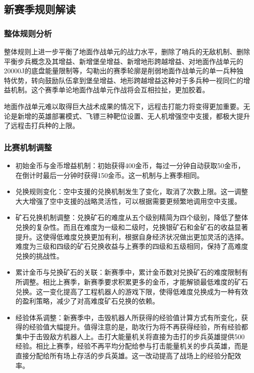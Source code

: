 \subsection{新赛季规则解读}

    \subsubsection{整体规则分析}

        整体规则上进一步平衡了地面作战单元的战力水平，删除了哨兵的无敌机制、删除平衡步兵概念及其增益、新增堡垒增益、新增地形跨越增益、对地面作战单元的20000J的底盘能量限制等，勾勒出的赛季轮廓是削弱地面作战单元的单一兵种独特优势，转向鼓励队伍拿到堡垒增益、地形跨越增益这种对于多兵种一视同仁的增益机制。这个赛季单论地面作战单元作战将会互相拉扯，更加胶着。\par
        地面作战单元难以取得巨大战术成果的情况下，远程击打能力将变得更加重要。无论是新增的英雄部署模式、飞镖三种靶位设置、无人机增强空中支援，都极大提升了远程击打兵种的上限。\par

    \subsubsection{比赛机制调整}


        \begin{itemize}
            \item 初始金币与金币增益机制：初始获得400金币，每过一分钟自动获取50金币，在倒计时最后一分钟时获得150金币。这一机制与上赛季相同。
            \item 兑换规则变化：空中支援的兑换机制发生了变化，取消了次数上限。这一调整大大增强了空中支援的战略灵活性，可以根据需要更频繁地调用空中支援。
            \item 矿石兑换机制调整：兑换矿石的难度从五个级别精简为四个级别，降低了整体兑换的复杂性。而且在难度为一级和二级时，兑换银矿石和金矿石的收益显著提升。这使得低难度兑换更加有利，根据自身经济状况做出更加灵活的选择。难度为三级和四级的矿石兑换收益与上赛季的四级和五级相同，保持了高难度兑换的挑战性。
            \item 累计金币与兑换矿石的关联：新赛季中，累计金币数对兑换矿石的难度限制有所调整。相比上赛季，新赛季要求积累更多的金币，才能解锁最低难度的矿石兑换。这一变化提高了工程机器人的游戏下限，使得低难度兑换成为一种有效的盈利策略，减少了对高难度矿石兑换的依赖。
            \item 经验体系调整：新赛季中，击毁机器人所获得的经验值计算方式有所变化，获得的经验值大幅提升。值得注意的是，助攻行为将不再获得经验，所有经验都集中于击毁敌方机器人上。击打大能量机关将直接为击打的步兵英雄提供500经验。相比上赛季，经验不再平均分配给参与打击能量机关的步兵英雄，而是直接分配给所有场上存活的步兵英雄。这一改动提高了战场上的经验分配效率。
        \end{itemize}

